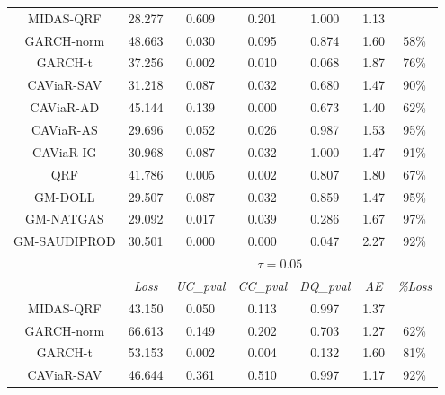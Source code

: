 \begin{table}[H]
\begin{tabular}{ccccccc}
\rowcolor[HTML]{D9D9D9} MIDAS-QRF  & 28.277 & 0.609    & 0.201    & 1.000    & 1.13 &        \\
\rowcolor[HTML]{D9D9D9}GARCH-norm                                              & 48.663 & 0.030    & 0.095    & 0.874    & 1.60 & 58\%   \\
GARCH-t                                                 & 37.256 & 0.002    & 0.010    & 0.068    & 1.87 & 76\%   \\
\rowcolor[HTML]{D9D9D9} CAViaR-SAV & 31.218 & 0.087    & 0.032    & 0.680    & 1.47 & 90\%   \\
CAViaR-AD                                               & 45.144 & 0.139    & 0.000    & 0.673    & 1.40 & 62\%   \\
\rowcolor[HTML]{D9D9D9}CAViaR-AS                                               & 29.696 & 0.052    & 0.026    & 0.987    & 1.53 & 95\%   \\
\rowcolor[HTML]{D9D9D9} CAViaR-IG  & 30.968 & 0.087    & 0.032    & 1.000    & 1.47 & 91\%   \\
QRF                                                     & 41.786 & 0.005    & 0.002    & 0.807    & 1.80 & 67\%   \\
\rowcolor[HTML]{D9D9D9}GM-DOLL                                                 & 29.507 & 0.087    & 0.032    & 0.859    & 1.47 & 95\%   \\
\rowcolor[HTML]{D9D9D9}GM-NATGAS                                               & 29.092 & 0.017    & 0.039    & 0.286    & 1.67 & 97\%   \\
GM-SAUDIPROD                                            & 30.501 & 0.000    & 0.000    & 0.047    & 2.27 & 92\%   \\ \hline
                                                        & \multicolumn{6}{c}{$\tau=0.05$}                         \\ \hline
                                                        & \textit{Loss}   & \textit{UC\_pval} & \textit{CC\_pval} & \textit{DQ\_pval }& \textit{AE }  & \textit{\%Loss}\\
\rowcolor[HTML]{D9D9D9} MIDAS-QRF  & 43.150 & 0.050    & 0.113    & 0.997    & 1.37 &        \\
\rowcolor[HTML]{D9D9D9} GARCH-norm & 66.613 & 0.149    & 0.202    & 0.703    & 1.27 & 62\%   \\
GARCH-t                                                 & 53.153 & 0.002    & 0.004    & 0.132    & 1.60 & 81\%   \\
\rowcolor[HTML]{D9D9D9} CAViaR-SAV & 46.644 & 0.361    & 0.510    & 0.997    & 1.17 & 92\%   \\

\end{tabular}
\end{table}
